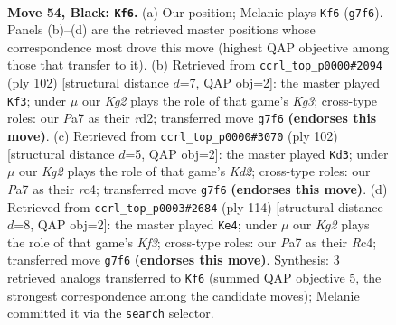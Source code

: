\documentclass[11pt]{article}
\begin{document}
\clearpage

\begin{figure}[p]\centering
\begin{subfigure}{0.46\textwidth}\centering
\resizebox{\linewidth}{!}{%
\newchessgame
\chessboard[
  setfen={8/p2p2k1/2p5/5P2/2r5/5K2/8/8 b - - 10 54},
  showmover=false,
  pgfstyle=straightmove, color=movearrow, markmove={g7-f6}
]}
\caption{}
\end{subfigure}\hfill
\begin{subfigure}{0.46\textwidth}\centering
\resizebox{\linewidth}{!}{%
\newchessgame
\chessboard[
  setfen={6k1/2R5/7p/5P2/6P1/6K1/3r4/8 w - - 7 52},
  showmover=false,
  pgfstyle=straightmove, color=movearrow, markmove={g3-f3}
]}
\caption{}
\end{subfigure}
\\[4pt]
\begin{subfigure}{0.46\textwidth}\centering
\resizebox{\linewidth}{!}{%
\newchessgame
\chessboard[
  setfen={8/3k4/8/P3R3/2r5/1p6/1P1K4/8 w - - 3 52},
  showmover=false,
  pgfstyle=straightmove, color=movearrow, markmove={d2-d3}
]}
\caption{}
\end{subfigure}\hfill
\begin{subfigure}{0.46\textwidth}\centering
\resizebox{\linewidth}{!}{%
\newchessgame
\chessboard[
  setfen={8/4k3/6p1/6P1/2R2P2/5K2/8/r7 w - - 27 58},
  showmover=false,
  pgfstyle=straightmove, color=movearrow, markmove={f3-e4}
]}
\caption{}
\end{subfigure}
\caption{\textbf{Move 54, Black: \texttt{Kf6}.} (a) Our position; Melanie plays \texttt{Kf6} (\texttt{g7f6}). Panels (b)--(d) are the retrieved master positions whose correspondence most drove this move (highest QAP objective among those that transfer to it). (b) Retrieved from \texttt{ccrl\_top\_p0000\#2094} (ply 102) [structural distance $d$=7, QAP obj=2]: the master played \texttt{Kf3}; under $\mu$ our \emph{Kg2} plays the role of that game's \emph{Kg3}; cross-type roles: our \emph{P}a7 as their \emph{r}d2; transferred move \texttt{g7f6} \textbf{(endorses this move)}. (c) Retrieved from \texttt{ccrl\_top\_p0000\#3070} (ply 102) [structural distance $d$=5, QAP obj=2]: the master played \texttt{Kd3}; under $\mu$ our \emph{Kg2} plays the role of that game's \emph{Kd2}; cross-type roles: our \emph{P}a7 as their \emph{r}c4; transferred move \texttt{g7f6} \textbf{(endorses this move)}. (d) Retrieved from \texttt{ccrl\_top\_p0003\#2684} (ply 114) [structural distance $d$=8, QAP obj=2]: the master played \texttt{Ke4}; under $\mu$ our \emph{Kg2} plays the role of that game's \emph{Kf3}; cross-type roles: our \emph{P}a7 as their \emph{R}c4; transferred move \texttt{g7f6} \textbf{(endorses this move)}. Synthesis: 3 retrieved analogs transferred to \texttt{Kf6} (summed QAP objective 5, the strongest correspondence among the candidate moves); Melanie committed it via the \texttt{search} selector.}
\label{fig:thought-m107}
\end{figure}
\end{document}
